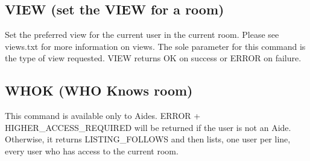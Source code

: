 \subsection{VIEW (set the VIEW for a room)}

 Set the preferred view for the current user in the current room.  Please see
views.txt for more information on views.  The sole parameter for this command
is the type of view requested.  VIEW returns OK on success or ERROR on failure.



\subsection{WHOK (WHO Knows room)}

 This command is available only to Aides.  ERROR + HIGHER_ACCESS_REQUIRED
will be returned if the user is not an Aide.  Otherwise, it returns
LISTING_FOLLOWS and then lists, one user per line, every user who has
access to the current room.


